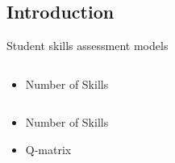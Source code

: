 \documentclass{beamer}
\begin{document}
\subsection{Introduction}
\begin{frame}
\vspace{-1cm}
    \begin{block}{Student skills assessment models}
    \vspace{-0.5cm}
    \end{block}
\begin{overprint}
		\begin{columns}
		\begin{column}{0.35\textwidth}
      		\begin{itemize}
      		\vspace{-0.05cm}
      			\item Number of Skills
	      	\end{itemize}
	      \end{column}
	      \begin{column}{0.7\textwidth}
	      \end{column}
	     \end{columns}
		\begin{columns}
		\begin{column}{0.35\textwidth}
      		\begin{itemize}
      		   	\vspace{-1.1cm}
      			\item Number of Skills
      			\item Q-matrix
	      	\end{itemize}
	      \end{column}
	      \begin{column}{0.7\textwidth}
	      

\end{column}
\end{columns}
\end{overprint}
\end{frame}
\end{document}
